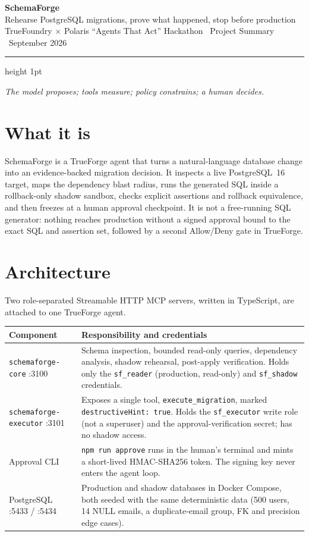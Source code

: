 \documentclass[10pt,a4paper]{article}
\begin{document}
\begin{center}
  {\color{sfnavy}\LARGE\bfseries SchemaForge}\\[0.5ex]
  {\normalsize Rehearse PostgreSQL migrations, prove what happened, stop before production}\\[0.4ex]
  {\footnotesize TrueFoundry $\times$ Polaris ``Agents That Act'' Hackathon \textperiodcentered\ Project Summary \textperiodcentered\ September 2026}
\end{center}
\vspace{0.2ex}
{\color{sfrule}\hrule height 1pt}
\vspace{0.8ex}

\colorbox{sfbox}{\parbox{\dimexpr\linewidth-2\fboxsep}{\centering\itshape
The model proposes; tools measure; policy constrains; a human decides.}}

\section*{What it is}
SchemaForge is a TrueForge agent that turns a natural-language database change into an
evidence-backed migration decision. It inspects a live PostgreSQL~16 target, maps the dependency
blast radius, runs the generated SQL inside a rollback-only shadow sandbox, checks explicit
assertions and rollback equivalence, and then freezes at a human approval checkpoint. It is not a
free-running SQL generator: nothing reaches production without a signed approval bound to the exact SQL and
assertion set, followed by a second Allow/Deny gate in TrueForge.

\section*{Architecture}
Two role-separated Streamable HTTP MCP servers, written in TypeScript, are attached to one TrueForge agent.

\begin{tabularx}{\linewidth}{@{}p{3.9cm}X@{}}
\toprule
\textbf{Component} & \textbf{Responsibility and credentials} \\
\midrule
\texttt{schemaforge-core} :3100 & Schema inspection, bounded read-only queries, dependency analysis, shadow
rehearsal, post-apply verification. Holds only the \texttt{sf\_reader} (production, read-only) and
\texttt{sf\_shadow} credentials. \\
\texttt{schemaforge-executor} :3101 & Exposes a single tool, \texttt{execute\_migration}, marked
\texttt{destructiveHint: true}. Holds the \texttt{sf\_executor} write role (not a superuser) and the
approval-verification secret; has no shadow access. \\
Approval CLI & \texttt{npm run approve} runs in the human's terminal and mints a short-lived
HMAC-SHA256 token. The signing key never enters the agent loop. \\
PostgreSQL :5433 / :5434 & Production and shadow databases in Docker Compose, both seeded with the
same deterministic data (500 users, 14 NULL emails, a duplicate-email group, FK and precision edge cases). \\
\bottomrule
\end{tabularx}
\end{document}
